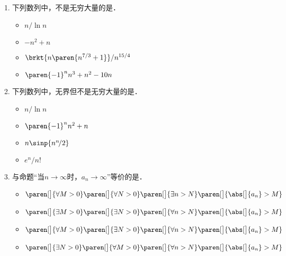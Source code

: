 \documentclass[a4paper,punct=CCT]{ctexbook}
\theoremstyle{definition}
\theoremstyle{remark}
\newif\ifshowsol
\begin{document}
\begin{enumerate}
\item 下列数列中，不是无穷大量的是\uline{\makebox[8em]{}}．
  \begin{itemize}
    \renewcommand{\labelitemi}{\faCircleThin}
  \item \(n/\!\ln n\)
  \item \(-n^2 + n\)
    \ifshowsol
  \item[\faCircle]
    \else
  \item
    \fi
    \(\brkt{n\paren{n^{7/3}+1}}/n^{15/4}\)
  \item \(\paren{-1}^n n^3 + n^2 - 10n\)
  \end{itemize}

\item 下列数列中，无界但不是无穷大量的是\uline{\makebox[6em]{}}．
  \begin{itemize}
    \renewcommand{\labelitemi}{\faCircleThin}
  \item \(n/\!\ln n\)
  \item \(\paren{-1}^n n^2 + n\)
    \ifshowsol
  \item[\faCircle]
    \else
  \item
    \fi
    \(n \sinp{n^n\!/2}\)
  \item \(e^n\!/n!\)
  \end{itemize}

\item 与命题“当\(n\to\infty\)时，\(a_n\to\infty\)”等价的是\uline{\makebox[10em]{}}．
  \begin{itemize}
    \renewcommand{\labelitemi}{\faCircleThin}
  \item \(
    \paren[\big]{\forall M > 0}
    \paren[\big]{\forall N > 0}
    \paren[\big]{\exists n > N}
    \paren[\big]{\abs[\big]{a_n} > M}
    \)
  \item \(
    \paren[\big]{\exists M > 0}
    \paren[\big]{\exists N > 0}
    \paren[\big]{\forall n > N}
    \paren[\big]{\abs[\big]{a_n} > M}
    \)
    \ifshowsol
  \item[\faCircle]
    \else
  \item
    \fi
    \(
    \paren[\big]{\forall M > 0}
    \paren[\big]{\exists N > 0}
    \paren[\big]{\forall n > N}
    \paren[\big]{\abs[\big]{a_n} > M}
    \)
  \item \(
    \paren[\big]{\exists N > 0}
    \paren[\big]{\forall M > 0}
    \paren[\big]{\forall n > N}
    \paren[\big]{\abs[\big]{a_n} > M}
    \)
  \end{itemize}

  \ifshowsol
  选项~A其实相当于是说数列\(\Seq{a_n}\)无界，选项~D是一个不可满足的命题．
  \fi


\end{enumerate}
\end{document}
